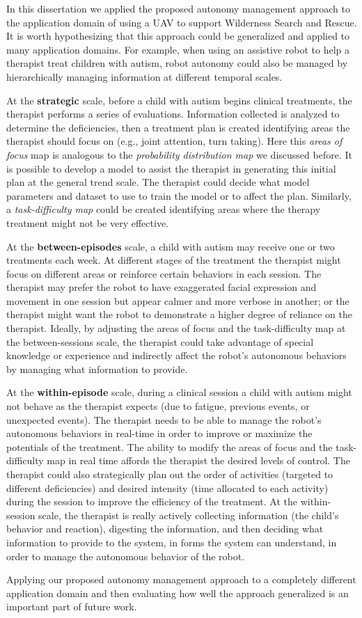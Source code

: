 In this dissertation we applied the proposed autonomy management approach to the application domain of using a UAV to support Wilderness Search and Rescue. It is worth hypothesizing that this approach could be generalized and applied to many application domains. For example, when using an assistive robot to help a therapist treat children with autism, robot autonomy could also be managed by hierarchically managing information at different temporal scales. 

At the \textbf{strategic} scale, before a child with autism begins clinical treatments, the therapist performs a series of evaluations. Information collected is analyzed to determine the deficiencies, then a treatment plan is created identifying areas the therapist should focus on (e.g., joint attention, turn taking). Here this 
\textit{areas of focus} map is analogous to the \textit{probability distribution map} we discussed before. It is possible to develop a model to assist the therapist in generating this initial plan at the general trend scale. The therapist could decide what model parameters and dataset to use to train the model or to affect the plan. Similarly, a \textit{task-difficulty map} could be created identifying areas where the therapy treatment might not be very effective.

At the \textbf{between-episodes} scale, a child with autism may receive one or two treatments each week. At different stages of the treatment the therapist might focus on different areas or reinforce certain behaviors in each session. The therapist may prefer the robot to have exaggerated facial expression and movement in one session but appear calmer and more verbose in another; or the therapist might want the robot to demonstrate a higher degree of reliance on the therapist. Ideally, by adjusting the areas of focus and the task-difficulty map at the between-sessions scale, the therapist could take advantage of special knowledge or experience and indirectly affect the robot's autonomous behaviors by managing what information to provide.

At the \textbf{within-episode} scale, during a clinical session a child with autism might not behave as the therapist expects (due to fatigue, previous events, or unexpected events). The therapist needs to be able to manage the robot's autonomous behaviors in real-time in order to improve or maximize the potentials of the treatment. The ability to modify the areas of focus and the task-difficulty map in real time affords the therapist the desired levels of control. The therapist could also strategically plan out the order of activities (targeted to different deficiencies) and desired intensity (time allocated to each activity) during the session to improve the efficiency of the treatment. At the within-session scale, the therapist is really actively collecting information (the child's behavior and reaction), digesting the information, and then deciding what information to provide to the system, in forms the system can understand, in order to manage the autonomous behavior of the robot.

Applying our proposed autonomy management approach to a completely different application domain and then evaluating how well the approach generalized is an important part of future work.